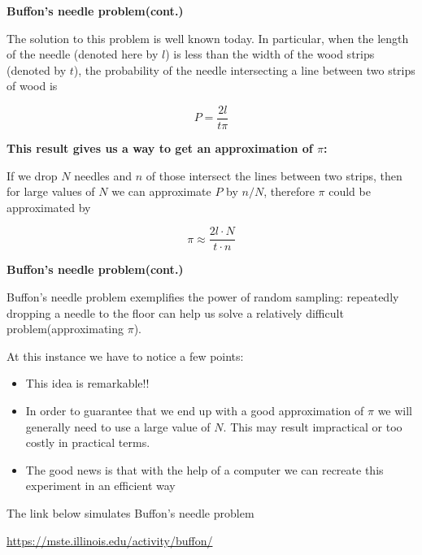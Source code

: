 \documentclass{beamer}
\begin{document}
\frame
{

{\bf Buffon's needle problem(cont.)}
\vspace{2mm}

The solution to this problem is well known today. In particular, when the length of the needle (denoted here by $l$) is less than the width of the wood strips (denoted by $t$), the probability of the needle intersecting a line between two strips of wood is 

\[P=\frac{2l}{t\pi}\]

{\bf This result gives us a way to get an approximation of $\pi$:}

If we drop $N$ needles and $n$ of those intersect the lines between two strips, then for large values of $N$ we can approximate $P$ by $n/N$, therefore $\pi$ could be approximated by

\[\pi \approx \frac{2l\cdot N}{t\cdot n}\]


}

\frame
{

{\bf Buffon's needle problem(cont.)}
\vspace{2mm}

Buffon's needle problem exemplifies the power of random sampling:  repeatedly dropping a needle to the floor can help us solve a relatively difficult problem(approximating $\pi$).
\vspace{2mm}

At this instance we have to notice a few points:
\vspace{2mm}

\begin{itemize}

\item This idea is remarkable!!

\item In order to guarantee that we end up with a good approximation of $\pi$ we will generally need to use a large value of $N$. This may result impractical or too costly in practical terms. 

\item The good news is that with the help of a computer we can recreate this experiment in an efficient way

\end{itemize}

The link below simulates Buffon's needle problem
\vspace{2mm}

\url{https://mste.illinois.edu/activity/buffon/}

}
\end{document}
